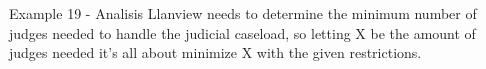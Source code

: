 \begin{frame}{Example 19 - Analisis}
Llanview needs to determine the minimum number of judges needed
to handle the judicial caseload, so letting X be the amount of judges
needed it's all about minimize X with the given restrictions.
\end{frame}
